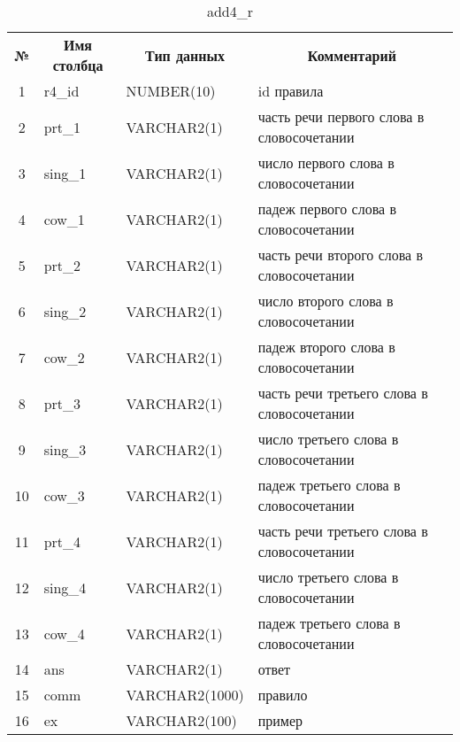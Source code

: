 \documentclass[main]{subfiles}
\begin{document}
\begin{longtable}[c]{|c|l|l|p{215px}|}
		\captionsetup{format=hang,labelsep = endash, singlelinecheck=false}
		\caption{add4\_r}\label{tab5}\\
			\hline
			\textbf{№} & \multicolumn{1}{c|}{\textbf{Имя столбца}} & \multicolumn{1}{c|}{\textbf{Тип данных}} & \multicolumn{1}{c|}{\textbf{Комментарий}} \\ \hline
			1&r4\_id & NUMBER(10)&id правила\\ \hline
			2& prt\_1 &VARCHAR2(1) & часть речи первого слова в словосочетании \\ \hline
			3& sing\_1 & VARCHAR2(1)& число первого слова в словосочетании \\ \hline
			4& cow\_1 &VARCHAR2(1) & падеж первого слова в словосочетании \\ \hline
			5& prt\_2 &VARCHAR2(1) & часть речи второго слова в словосочетании \\ \hline
			6& sing\_2 & VARCHAR2(1)& число второго слова в словосочетании \\ \hline
			7& cow\_2 &VARCHAR2(1) & падеж второго слова в словосочетании \\ \hline
			8& prt\_3 &VARCHAR2(1) & часть речи третьего слова в словосочетании \\ \hline
			9& sing\_3 & VARCHAR2(1)& число третьего слова в словосочетании \\ \hline
			10& cow\_3 &VARCHAR2(1) & падеж третьего слова в словосочетании \\ \hline
			11& prt\_4 &VARCHAR2(1) & часть речи третьего слова в словосочетании \\ \hline
			12& sing\_4 &VARCHAR2(1) & число третьего слова в словосочетании \\ \hline
			13& cow\_4 & VARCHAR2(1)& падеж третьего слова в словосочетании \\ \hline
			14&ans&VARCHAR2(1)& ответ\\ \hline
			15&comm &VARCHAR2(1000)& правило\\ \hline
			16 &ex &VARCHAR2(100)&пример  \\ \hline
\end{longtable}
\end{document}
